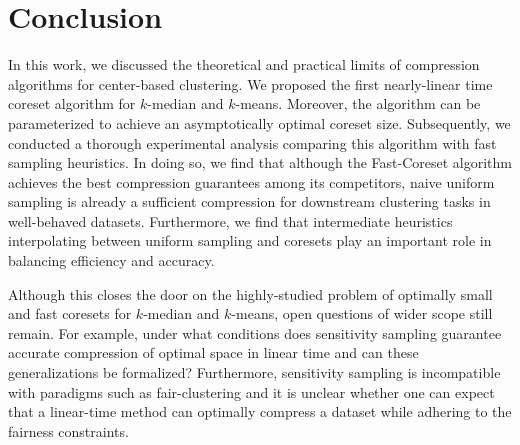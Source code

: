 \section{Conclusion}

In this work, we discussed the theoretical and practical limits of compression algorithms for center-based clustering. We proposed the first nearly-linear time
coreset algorithm for $k$-median and $k$-means. Moreover, the algorithm can be parameterized to achieve an asymptotically optimal coreset size. Subsequently, we
conducted a thorough experimental analysis comparing this algorithm with fast sampling heuristics. In doing so, we find that although the Fast-Coreset algorithm
achieves the best compression guarantees among its competitors, naive uniform sampling is already a sufficient compression for downstream clustering tasks in
well-behaved datasets. Furthermore, we find that intermediate heuristics interpolating between uniform sampling and coresets play an important role in
balancing efficiency and accuracy. 

Although this closes the door on the highly-studied problem of optimally small and fast coresets for $k$-median and $k$-means, open questions of wider scope
still remain. For example, under what conditions does sensitivity sampling guarantee accurate compression of optimal space in linear time and can these
generalizations be formalized? Furthermore, sensitivity sampling is incompatible with paradigms such as fair-clustering \cite{BandyapadhyayFS21,BravermanCJKST022,cohen2019fixed,HuangJV19,HLW23,SSS19} and it is unclear whether one can expect that a linear-time method can optimally compress a dataset while adhering to the fairness constraints.
